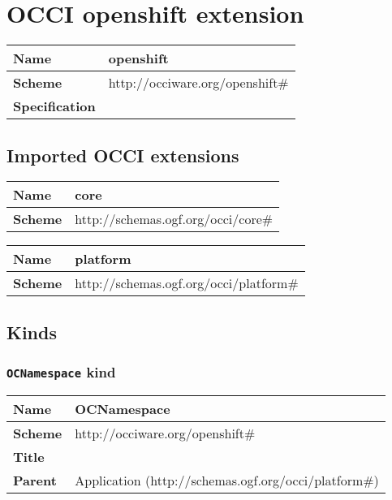 \section{OCCI openshift extension}
\begin{center}
\begin{tabular}{|l|l|}
  \hline
  \textbf{Name} & openshift \\
  \hline  
  \textbf{Scheme} & http://occiware.org/openshift\# \\
  \hline
  \textbf{Specification} &  \\
  \hline
\end{tabular}
\end{center}

\subsection{Imported OCCI extensions}

\begin{center} 
\begin{tabular}{|l|l|}
  \hline
  \textbf{Name} & core \\
  \hline  
  \textbf{Scheme} & http://schemas.ogf.org/occi/core\# \\
  \hline
\end{tabular}
\end{center}
\begin{center} 
\begin{tabular}{|l|l|}
  \hline
  \textbf{Name} & platform \\
  \hline  
  \textbf{Scheme} & http://schemas.ogf.org/occi/platform\# \\
  \hline
\end{tabular}
\end{center}


\subsection{Kinds}
\subsubsection{\texttt{OCNamespace} kind}
\begin{center}
\begin{tabular}{|l|l|}
  \hline
  \textbf{Name} & OCNamespace \\
  \hline  
  \textbf{Scheme} & http://occiware.org/openshift\# \\
  \hline
  \textbf{Title} &  \\
  \hline
  \textbf{Parent} & Application (http://schemas.ogf.org/occi/platform\#) \\
  \hline
\end{tabular}
\end{center}



